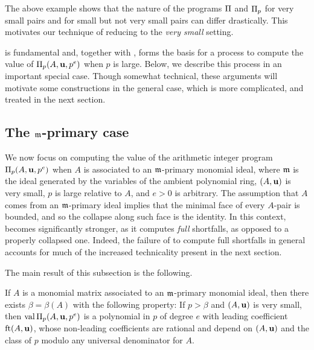 \documentclass{amsart}
\begin{document}
The above example shows that the nature of the programs $\Pi$ and $\Pi_p$ for very small pairs and for small but not very small pairs can differ drastically.
This motivates our technique of reducing to the \emph{very small} setting.

 is fundamental and, together with , forms the basis for a process to compute the value of $\Pi_p(A, \mathbf{u}, p^e)$ when $p$ is large.  Below, we describe this process in an important special case.  Though somewhat technical, these arguments will motivate some constructions in the general case, which is more complicated, and treated in the next section.

\subsection{The $\mathfrak{m}$-primary case}
\label{m-primary: SS}

We now focus on computing the value of the arithmetic integer program $\Pi_p(A,\mathbf{u}, p^e)$ when $A$ is associated to an $\mathfrak{m}$-primary monomial ideal, where $\mathfrak{m}$ is the ideal generated by the variables of the ambient polynomial ring, $(A,\mathbf{u})$ is very small, $p$ is large relative to $A$, and $e > 0$ is arbitrary.
The assumption that $A$ comes from an $\mathfrak{m}$-primary ideal implies that the minimal face of every $A$-pair is bounded, and so the collapse along such face is the identity.
In this context,  becomes significantly stronger, as it computes \emph{full} shortfalls, as opposed to a properly collapsed one.
Indeed, the failure of  to compute full shortfalls in general accounts for much of the increased technicality present in the next section.

The main result of this subsection is the following.

\begin{theorem}
   \label{m-primary AIP: T}
   If $A$ is a monomial matrix associated to an $\mathfrak{m}$-primary monomial ideal, then there exists $\beta=\beta(A)$ with the following property\textup:
   If $p > \beta$ and $(A,\mathbf{u})$ is very small, then $\operatorname{val} \Pi_p(A,\mathbf{u},p^e)$ is a polynomial in $p$ of degree $e$ with leading coefficient $\operatorname{ft}(A, \mathbf{u})$, whose non-leading coefficients are rational and depend on $(A,\mathbf{u})$ and the class of $p$ modulo any universal denominator for $A$.
\end{theorem}
\end{document}
